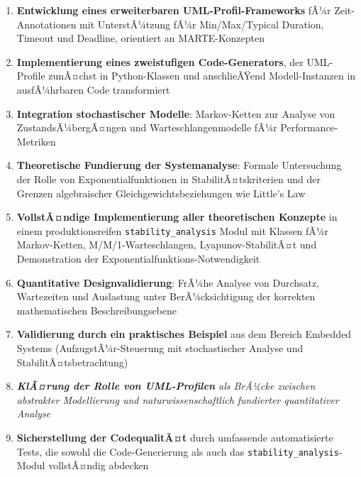﻿\documentclass[a4paper,12pt]{report}
\theoremstyle{definition}
\begin{document}
\begin{enumerate}
	\item[-] \textbf{Entwicklung eines erweiterbaren UML-Profil-Frameworks} fÃ¼r Zeit-Anno\-tationen mit UnterstÃ¼tzung fÃ¼r Min/Max/Typical Duration, Timeout und Deadline, orientiert an MARTE-Konzepten
	
	\item[-] \textbf{Implementierung eines zweistufigen Code-Generators}, der UML-Profile zu\-nÃ¤chst in Python-Klassen und anschlieÃŸend Modell-Instanzen in ausfÃ¼hrbaren Code transformiert
	
	\item[-] \textbf{Integration stochastischer Modelle}: Markov-Ketten zur Analyse von Zustands\-Ã¼bergÃ¤ngen und Warteschlangenmodelle fÃ¼r Performance-Metriken
	
	\item[-] \textbf{Theoretische Fundierung der Systemanalyse}: Formale Untersuchung der Rolle von Exponentialfunktionen in StabilitÃ¤tskriterien und der Grenzen algebraischer Gleichgewichtsbeziehungen wie Little's Law
	
	\item[-] \textbf{VollstÃ¤ndige Implementierung aller theoretischen Konzepte} in einem produktionsreifen \texttt{stability\_analysis} Modul mit Klassen fÃ¼r Markov-Ketten, M/M/1-Warteschlangen, Lyapunov-StabilitÃ¤t und Demonstration der Exponentialfunktions-Notwendigkeit
	
	\item[-] \textbf{Quantitative Designvalidierung}: FrÃ¼he Analyse von Durchsatz, Wartezeiten und Auslastung unter BerÃ¼cksichtigung der korrekten mathematischen Beschreibungsebene
	
	\item[-] \textbf{Validierung durch ein praktisches Beispiel} aus dem Bereich Embedded Systems (AufzugstÃ¼r-Steuerung mit stochastischer Analyse und StabilitÃ¤tsbetrachtung)
	
	\item[-] \textit{\textbf{KlÃ¤rung der Rolle von UML-Profilen} als BrÃ¼cke zwischen abstrakter Modellierung und naturwissenschaftlich fundierter quantitativer Analyse}
	
    \item[-] \textbf{Sicherstellung der CodequalitÃ¤t} durch umfassende
	automatisierte Tests, die sowohl die Code-Generierung als auch
	das \texttt{stability\_analysis}-Modul vollstÃ¤ndig abdecken
\end{enumerate}
\end{document}

